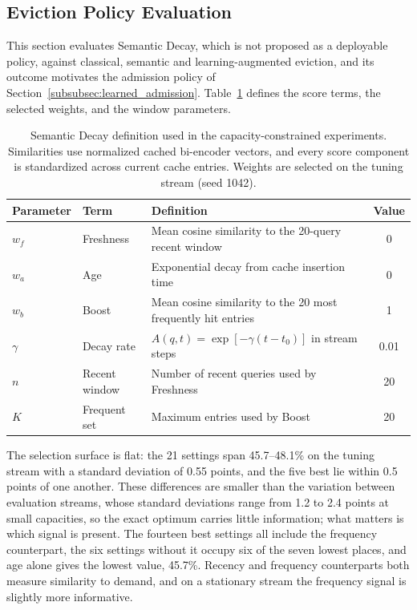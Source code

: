 \documentclass[authoryear,preprint,review,12pt]{elsarticle}
\begin{document}
\subsection{Eviction Policy Evaluation}
\label{subsubsec:eviction_policy_impact}
This section evaluates Semantic Decay, which is not proposed as a deployable policy, against classical, semantic and learning-augmented eviction, and its outcome motivates the admission policy of Section~\ref{subsubsec:learned_admission}. Table~\ref{tab:semantic_decay_weights} defines the score terms, the selected weights, and the window parameters.



\begin{table}[htbp]
\centering
\caption{Semantic Decay definition used in the capacity-constrained experiments. Similarities use normalized cached bi-encoder vectors, and every score component is standardized across current cache entries. Weights are selected on the tuning stream (seed 1042).}
\label{tab:semantic_decay_weights}
\footnotesize
\begin{tabular}{llp{}c}
\toprule
Parameter & Term & Definition & Value \\
\midrule
$w_f$ & Freshness & Mean cosine similarity to the 20-query recent window & 0 \\
$w_a$ & Age & Exponential decay from cache insertion time & 0 \\
$w_b$ & Boost & Mean cosine similarity to the 20 most frequently hit entries & 1 \\
$\gamma$ & Decay rate & $A(q,t)=\exp[-\gamma(t-t_0)]$ in stream steps & 0.01 \\
$n$ & Recent window & Number of recent queries used by Freshness & 20 \\
$K$ & Frequent set & Maximum entries used by Boost & 20 \\
\bottomrule
\end{tabular}
\end{table}

The selection surface is flat: the 21 settings span 45.7--48.1\% on the tuning stream with a standard deviation of 0.55 points, and the five best lie within 0.5 points of one another. These differences are smaller than the variation between evaluation streams, whose standard deviations range from 1.2 to 2.4 points at small capacities, so the exact optimum carries little information; what matters is which signal is present. The fourteen best settings all include the frequency counterpart, the six settings without it occupy six of the seven lowest places, and age alone gives the lowest value, 45.7\%. Recency and frequency counterparts both measure similarity to demand, and on a stationary stream the frequency signal is slightly more informative.
\end{document}
